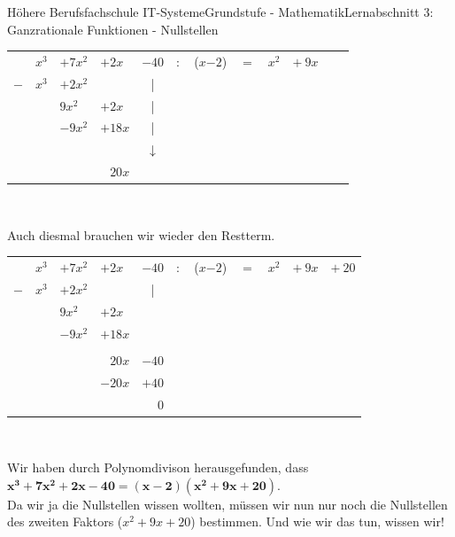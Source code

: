 \documentclass[11pt,twocolumn,oneside,openany,headings=optiontotoc,11pt,numbers=noenddot]{article}
\begin{document}
\begin{worksheet}{Höhere Berufsfachschule IT-Systeme}{Grundstufe - Mathematik}{Lernabschnitt 3: Ganzrationale Funktionen - Nullstellen}
\begin{tabularx}{0.5\textwidth}{rlllllllllll}
			& \(x^3\) & \(+\)\(7x^2\) & \(+\)\(2x\) & \(-\)\(40\) & \(:\) & (\colorbox{green!10}{\(x\)}\(-\)\(2\)) & \(=\) & \(x^2\) & \(+\ \)\(9x\)& \\
			\(-\) & \(x^3\) & \( +\)\(2x^2\) & & \multicolumn{1}{c}{|}\\
			\cline{1-3}
			& & \(9x^2\) & \(+\)\( 2x\) & \multicolumn{1}{c}{|}\\
			& & \(-\)\(9x^2\) & \(+18x\) & \multicolumn{1}{c}{|}\\
			\cline{3-4}
			& & & & \multicolumn{1}{c}{\(\downarrow\)}\\
			& & & \multicolumn{1}{r}{\colorbox{green!10}{\(20x\)}} & \\
		\end{tabularx}\\
		\par\noindent
		Auch diesmal brauchen wir wieder den Restterm.\\
		\par\noindent
		\begin{tabularx}{0.5\textwidth}{rlllllll|lll|}
			\cline{9-11}
			& \(x^3\) & \(+\)\(7x^2\) & \(+\)\(2x\) & \(-\)\(40\) & \(:\) & (\colorbox{green!10}{\(x\)}\(-\)\(2\)) & \(=\) & \(x^2\) & \(+\ \)\(9x\)& \(+\ \)\underline{\(20\)}\\
			\cline{9-11}
			\(-\) & \(x^3\) & \( +\)\(2x^2\) & & \multicolumn{1}{c}{|}\\
			\cline{1-3}
			& & \(9x^2\) & \(+\)\( 2x\) & \\
			& & \(-\)\(9x^2\) & \(+18x\) & \\
			\cline{3-4}\\
			& & & \multicolumn{1}{r}{\colorbox{green!10}{\(20x\)}} & \(-\)\(40\) \\
			& & & \(-\)\(20x\) & \(+\)\(40\) \\
			\cline{4-5}
			& & & & \multicolumn{1}{r}{\(0\)}
		\end{tabularx}\\
		\par\noindent
		Wir haben durch Polynomdivison herausgefunden, dass \(\mathbf{x^3+7x^2+2x-40=(x-2)(x^2+9x+20)}\).\\
		Da wir ja die Nullstellen wissen wollten, müssen wir nun nur noch die Nullstellen des zweiten Faktors (\(x^2+9x+20\)) bestimmen. Und wie wir das tun, wissen wir!
	\end{worksheet}
\end{document}
